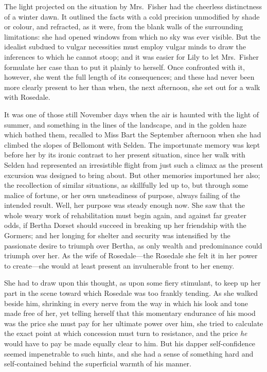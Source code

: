 \documentclass[12pt,a4paper]{book}
\begin{document}






The light projected on the situation by Mrs.\ Fisher had the
cheerless distinctness of a winter dawn. It outlined the facts
with a cold precision unmodified by shade or colour, and
refracted, as it were, from the blank walls of the surrounding
limitations: she had opened windows from which no sky was ever
visible. But the idealist subdued to vulgar necessities must
employ vulgar minds to draw the inferences to which he cannot
stoop; and it was easier for Lily to let Mrs.\ Fisher formulate
her case than to put it plainly to herself. Once confronted with
it, however, she went the full length of its consequences; and
these had never been more clearly present to her than when, the
next afternoon, she set out for a walk with Rosedale.





It was one of those still November days when the air is haunted
with the light of summer, and something in the lines of the
landscape, and in the golden haze which bathed them, recalled to
Miss Bart the September afternoon when she had climbed the slopes
of Bellomont with Selden. The importunate memory was kept before
her by its ironic contrast to her present situation, since her
walk with Selden had represented an irresistible flight from just
such a climax as the present excursion was designed to bring
about. But other memories importuned her also; the recollection
of similar situations, as skillfully led up to, but through some
malice of fortune, or her own unsteadiness of purpose, always
failing of the intended result. Well, her purpose was steady
enough now. She saw that the whole weary work of rehabilitation
must begin again, and against far greater odds, if Bertha Dorset
should succeed in breaking up her friendship with the Gormers;
and her longing for shelter and security was intensified by the
passionate desire to triumph over Bertha, as only wealth and
predominance could triumph over her. As the wife of Rosedale---the
Rosedale she felt it in her power to create---she would at least
present an invulnerable front to her enemy.





She had to draw upon this thought, as upon some fiery stimulant,
to keep up her part in the scene toward which Rosedale
was too frankly tending. As she walked beside him, shrinking in
every nerve from the way in which his look and tone made free of
her, yet telling herself that this momentary endurance of his
mood was the price she must pay for her ultimate power over him,
she tried to calculate the exact point at which concession must
turn to resistance, and the price \textit{he} would have to pay be made
equally clear to him. But his dapper self-confidence seemed
impenetrable to such hints, and she had a sense of something hard
and self-contained behind the superficial warmth of his manner.
\end{document}
